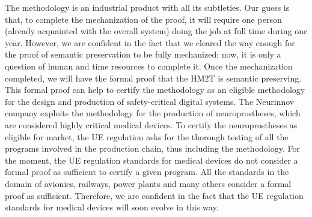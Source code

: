 \documentclass[pdflatex,sn-mathphys]{sn-jnl}%
\theoremstyle{thmstyleone}%
\theoremstyle{thmstyletwo}%
\theoremstyle{thmstylethree}%
\begin{document}
  

The \hilecop{} methodology is an industrial product with all its
subtleties. Our guess is that, to complete the mechanization of the
proof, it will require one person (already acquainted with the overall
system) doing the job at full time during one year.  However, we are
confident in the fact that we cleared the way enough for the proof of
semantic preservation to be fully mechanized; now, it is only a
question of human and time resources to complete it.  Once the
mechanization completed, we will have the formal proof that the HM2T
is semantic preserving. This formal proof can help to certify the
\hilecop{} methodology as an eligible methodology for the design and
production of safety-critical digital systems.  The Neurinnov company
exploits the \hilecop{} methodology for the production of
neuroprostheses, which are considered highly critical medical
devices. To certify the neuroprostheses as eligible for market, the UE
regulation asks for the thorough testing of all the programs involved
in the production chain, thus including the \hilecop{} methodology.
For the moment, the UE regulation standards for medical devices do not
consider a formal proof as sufficient to certify a given program.  All
the standards in the domain of avionics, railways, power plants and
many others consider a formal proof as sufficient. Therefore, we are
confident in the fact that the UE regulation standards for medical
devices will soon evolve in this way.
\end{document}

